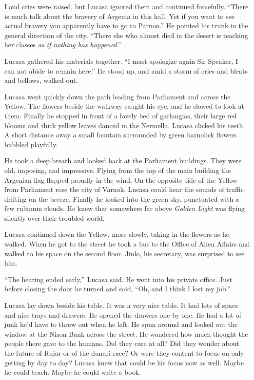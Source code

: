 Loud cries were raised, but Lucasa ignored them and continued forcefully. ``There is much talk
about the bravery of Argenia in this hall. Yet if you want to see actual bravery you apparently
have to go to Parnon.'' He pointed his trunk in the general direction of the city. ``There she
who almost died in the desert is teaching her classes \emph{as if nothing has happened}.''

Lucasa gathered his materials together. ``I must apologize again Sir Speaker, I can not abide to
remain here.'' He stood up, and amid a storm of cries and bleats and bellows, walked out.

\spacebreak


Lucasa went quickly down the path leading from Parliament and across the Yellow. The flowers
beside the walkway caught his eye, and he slowed to look at them. Finally he stopped in front of
a lovely bed of garlangias, their large red blooms and thick yellow leaves danced in the
Nermella. Lucasa clicked his teeth. A short distance away a small fountain surrounded by green
harnolick flowers bubbled playfully.

He took a deep breath and looked back at the Parliament buildings. They were old, imposing, and
impressive. Flying from the top of the main building the Argenian flag flapped proudly in the
wind. On the opposite side of the Yellow from Parliament rose the city of Varnok. Lucasa could
hear the sounds of traffic drifting on the breeze. Finally he looked into the green sky,
punctuated with a few rubinum clouds. He knew that somewhere far above \textit{Golden Light} was
flying silently over their troubled world.

Lucasa continued down the Yellow, more slowly, taking in the flowers as he walked. When he got
to the street he took a bus to the Office of Alien Affairs and walked to his space on the second
floor. Jinlo, his secretary, was surprised to see him.

``The hearing ended early,'' Lucasa said. He went into his private office. Just before closing
the door he turned and said, ``Oh, and I think I lost my job.''

Lucasa lay down beside his table. It was a very nice table. It had lots of space and nice trays
and drawers. He opened the drawers one by one. He had a lot of junk he'd have to throw out when
he left. He spun around and looked out the window at the Nizon Bank across the street. He
wondered how much thought the people there gave to the humans. Did they care at all? Did they
wonder about the future of Rujar or of the dunari race? Or were they content to focus on only
getting by day to day? Lucasa knew that could be his focus now as well. Maybe he could teach.
Maybe he could write a book.


